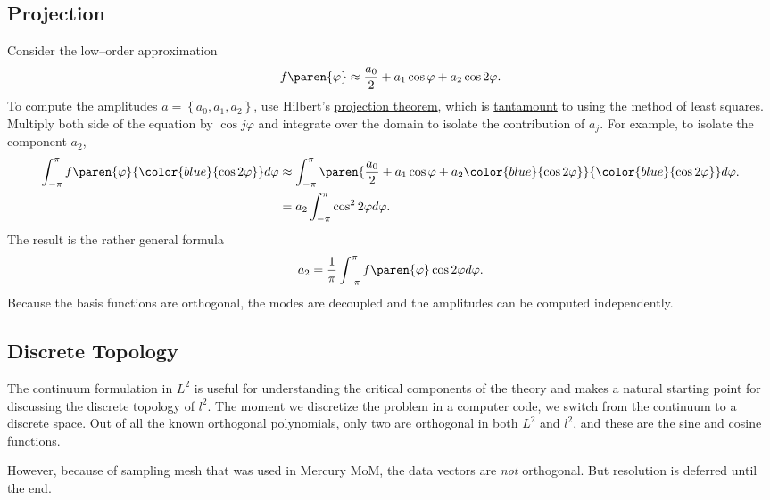 \subsection{Projection}
Consider the low--order approximation 
%
\begin{equation}
	f\paren{\varphi}  \approx \frac{a_{0}}{2}  + a_{1} \cos \varphi +  a_{2} \cos 2\varphi.
\end{equation}
%
To compute the amplitudes $a=\left\{a_{0}, a_{1}, a_{2} \right\}$, use Hilbert's \href{https://en.wikipedia.org/wiki/Hilbert_projection_theorem}{projection theorem}, which is \href{http://www.kris-nimark.net/pdf/ProjectionTheorem.pdf}{tantamount} to using the method of least squares. Multiply both side of the equation by $\cos j \varphi$ and integrate over the domain to isolate the contribution of $a_{j}$. For example, to isolate the component $a_{2}$,
%
\begin{equation}
	\begin{split}
		\int_{-\pi}^{\pi}{ f\paren{\varphi}  {\color{blue}{\cos 2\varphi }}} d\varphi  
			&\approx \int_{-\pi}^{\pi}{ \paren{\frac{a_{0}}{2}  + a_{1} \cos \varphi +  a_{2} {\color{blue}{\cos 2\varphi}} } {\color{blue}{\cos 2\varphi}}} d\varphi. \\
			&= a_{2} \int_{-\pi}^{\pi}{ \cos^{2} 2\varphi } d\varphi. \\
	\end{split}
\end{equation}
%
The result is the rather general formula
\begin{equation}
	a_{2} = \frac{1}{\pi} \int_{-\pi}^{\pi} f\paren{\varphi} \cos 2\varphi d\varphi.
\end{equation}
Because the basis functions are orthogonal, the modes are decoupled and the amplitudes can be computed independently.

\subsection{Discrete Topology}
The continuum formulation in $L^{2}$ is useful for understanding the critical components of the theory and makes a natural starting point for discussing the discrete topology of $l^{2}$. The moment we discretize the problem in a computer code, we switch from the continuum to a discrete space. Out of all the known orthogonal polynomials, only two are orthogonal in both $L^{2}$ and $l^{2}$, and these are the sine and cosine functions. 

However, because of sampling mesh that was used in Mercury MoM, the data vectors are {\it{not}} orthogonal. But resolution is deferred until the end.



